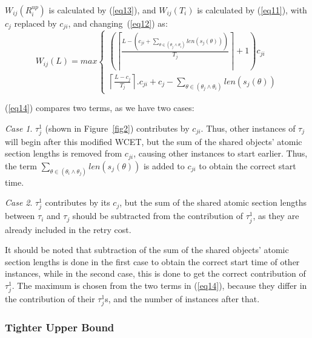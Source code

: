 \documentclass[12pt,english]{report}
\begin{document}
$W_{ij}(R_{i}^{up})$ is calculated by (\ref{eq13}), and $W_{ij}(T_{i})$
is calculated by (\ref{eq11}), with $c_{j}$ replaced by 
$c_{ji}$, and changing~(\ref{eq12}) as:
\begin{equation}
W_{ij}(L)=max\begin{cases}
\left(\left\lceil\frac{L-\left(c_{ji}+\sum_{\theta\in(\theta_{j}\wedge\theta_{i})}len(s_{j}(\theta))\right)}{T_{j}}\right\rceil+1 \right)c_{ji}\\
\left\lceil\frac{L-c_{j}}{T_{j}}\right\rceil.c_{ji}+c_{j}-\sum_{\theta\in(\theta_{j}\wedge\theta_{i})}len(s_{j}(\theta))\end{cases}\label{eq14}\end{equation}

(\ref{eq14}) compares two terms, as we have two cases:


\textit{Case 1}. $\tau_j^1$ (shown in Figure~\ref{fig2}) contributes by $c_{ji}$. Thus, other instances of $\tau_j$ will begin after this modified WCET, but the sum of the shared objects' atomic section lengths is removed from $c_{ji}$, causing other instances to start earlier. Thus, the term $\sum_{\theta\in(\theta_i\wedge\theta_j)} {len(s_{j}(\theta))}$ is added to $c_{ji}$ to obtain the correct start time. 

\textit{Case 2}. $\tau_j^1$ contributes by its $c_j$, but the sum of the shared atomic section lengths  between $\tau_i$ and $\tau_j$ should be subtracted from the contribution of $\tau_j^1$, as they are already included in the retry cost. 

It should be noted that subtraction of the sum of the shared objects' atomic section lengths is done in the first case to obtain the correct start time of other instances, while in the second case, this is done to get the correct contribution of $\tau_j^1$. The maximum is chosen from the two terms in (\ref{eq14}), because they differ in the contribution of their $\tau_j^1$s, and the number of instances after that.


\subsubsection{Tighter Upper Bound}
\end{document}
